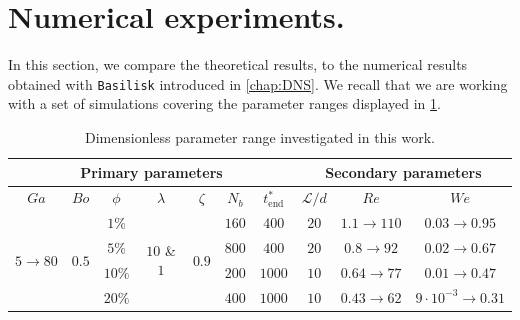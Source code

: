 \section{Numerical experiments. }

In this section, we compare the theoretical results, to the numerical results obtained with \texttt{Basilisk} introduced in \ref{chap:DNS}. 
We recall that we are working with a set of simulations covering the parameter ranges displayed in \ref{tab:simulations_recall}. 
\begin{table}[h!]
    \centering
    \caption{Dimensionless parameter range investigated in this work.}
    \begin{tabular}{|ccccccc|ccc|}
        \hline
        \multicolumn{7}{|c}{Primary parameters} & \multicolumn{3}{||c|}{Secondary parameters}\\ \hline
        \multicolumn{1}{|c|}{$Ga$}                               & \multicolumn{1}{c|}{$Bo$}                   & \multicolumn{1}{c|}{$\phi$} & \multicolumn{1}{c|}{$\lambda$}                    & \multicolumn{1}{c|}{$\zeta$}                & \multicolumn{1}{c|}{$N_b$} & $t^*_\text{end}$ & \multicolumn{1}{||c|}{$\mathcal{L}/d$} & \multicolumn{1}{c|}{$Re$}  & $We$   \\ \hline
        \multicolumn{1}{|c|}{\multirow{4}{*}{$5\rightarrow 80$}} & \multicolumn{1}{c|}{\multirow{4}{*}{$0.5$}} & \multicolumn{1}{c|}{$1\%$}  & \multicolumn{1}{c|}{\multirow{4}{*}{$10$ \& $1$}} & \multicolumn{1}{c|}{\multirow{4}{*}{$0.9$}} & \multicolumn{1}{c|}{$160$} & $400$           & \multicolumn{1}{||c|}{$20$}            & \multicolumn{1}{c|}{$1.1\to 110$} & {$0.03\to 0.95$} \\ 
        \multicolumn{1}{|c|}{}                                   & \multicolumn{1}{c|}{}                       & \multicolumn{1}{c|}{$5\%$}  & \multicolumn{1}{c|}{}                             & \multicolumn{1}{c|}{}                       & \multicolumn{1}{c|}{$800$} & $400$           & \multicolumn{1}{||c|}{$20$}            & \multicolumn{1}{c|}{$0.8\to 92$} &  {$0.02\to 0.67$}\\ 
        \multicolumn{1}{|c|}{}                                   & \multicolumn{1}{c|}{}                       & \multicolumn{1}{c|}{$10\%$} & \multicolumn{1}{c|}{}                             & \multicolumn{1}{c|}{}                       & \multicolumn{1}{c|}{$200$} & $1000$           & \multicolumn{1}{||c|}{$10$}            & \multicolumn{1}{c|}{$0.64\to 77$}&  {$0.01\to 0.47$}\\ 
        \multicolumn{1}{|c|}{}                                   & \multicolumn{1}{c|}{}                       & \multicolumn{1}{c|}{$20\%$} & \multicolumn{1}{c|}{}                             & \multicolumn{1}{c|}{}                       & \multicolumn{1}{c|}{$400$} & $1000$           & \multicolumn{1}{||c|}{$10$}            & \multicolumn{1}{c|}{$0.43\to 62$}&  {$9\cdot 10^{-3}\to 0.31$}\\ \hline
        \end{tabular}
    \label{tab:simulations_recall}
\end{table}

